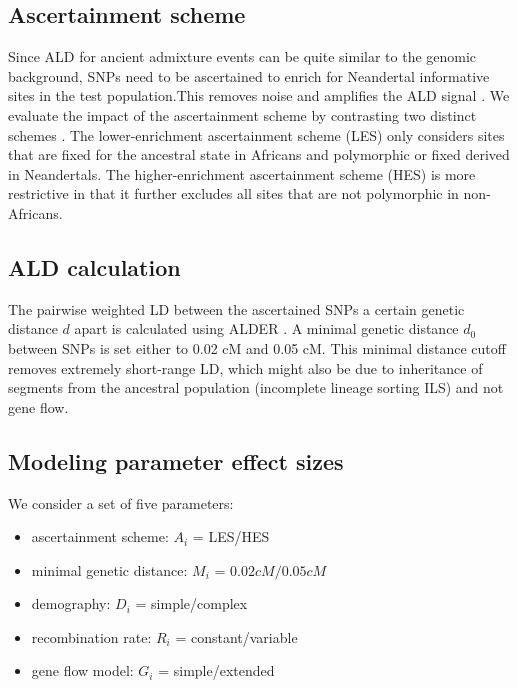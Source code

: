 \documentclass[]{article}
\begin{document}
\subsection{Ascertainment scheme}\label{asceteinment scheme}
Since ALD for ancient admixture events can be quite similar to the genomic background, SNPs need to be ascertained to enrich for
Neandertal informative sites in the test population.This removes noise and
amplifies the ALD signal \citep{sankararaman_date_2012}. 
We evaluate the impact of the ascertainment scheme by contrasting two distinct schemes \citep{sankararaman_date_2012,fu_genome_2014}. The lower-enrichment ascertainment scheme (LES) only considers  sites that are fixed for the ancestral state in
Africans and polymorphic or fixed derived in Neandertals. The higher-enrichment
ascertainment scheme (HES) is more restrictive in that it further excludes all sites that are not polymorphic in non-Africans.

\subsection{ALD calculation}\label{ALD calculation}

The pairwise weighted LD between the ascertained SNPs a certain genetic
distance \(d\) apart is calculated using ALDER
\citep{loh_inferring_2013}. A minimal genetic distance \(d_0\) between
SNPs is set either to 0.02 cM and 0.05 cM. This minimal distance cutoff
removes extremely short-range LD, which might also be due to inheritance of segments from the ancestral population (incomplete lineage sorting ILS) and not gene flow. 




\subsection{Modeling parameter effect sizes}\label{modeling prameter effect sizes}

We consider a set of five parameters:
\begin{itemize} 
    \item ascertainment scheme: $A_i$ = LES/HES
    \item minimal genetic distance: $M_i$ = $0.02 cM/ 0.05 cM$
    \item demography: $D_i$ = simple/complex
    \item recombination rate: $R_i$ = constant/variable
    \item gene flow model: $G_i$ = simple/extended
\end{itemize}
\end{document}
